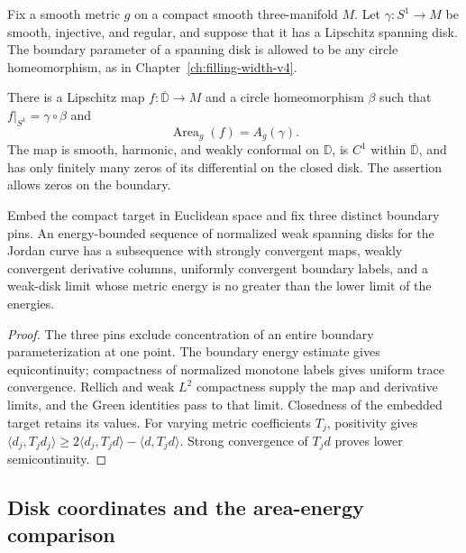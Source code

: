 Fix a smooth metric $g$ on a compact smooth three-manifold $M$.
Let $\gamma:S^1\to M$ be smooth, injective, and regular, and suppose
that it has a Lipschitz spanning disk.  The boundary parameter of a
spanning disk is allowed to be any circle homeomorphism, as in
Chapter~\ref{ch:filling-width-v4}.

\begin{theorem}
\label{thm:annular-plateau}
There is a Lipschitz map $f:\overline{\mathbb D}\to M$ and a circle
homeomorphism $\beta$ such that $f|_{S^1}=\gamma\circ\beta$ and
\[
 \operatorname{Area}_g(f)=A_g(\gamma).
\]
The map is smooth, harmonic, and weakly conformal on $\mathbb D$,
is $C^1$ within $\overline{\mathbb D}$, and has only finitely many
zeros of its differential on the closed disk.  The assertion allows
zeros on the boundary.
\end{theorem}

\begin{lemma}
\label{lem:annular-weak-disks}
Embed the compact target in Euclidean space and fix three distinct
boundary pins. An energy-bounded sequence of normalized weak
spanning disks for the Jordan curve has a subsequence with strongly
convergent maps, weakly convergent derivative columns, uniformly
convergent boundary labels, and a weak-disk limit whose metric
energy is no greater than the lower limit of the energies.
\end{lemma}
\begin{proof}
The three pins exclude concentration of an entire boundary
parameterization at one point. The boundary energy estimate gives
equicontinuity; compactness of normalized monotone labels gives
uniform trace convergence. Rellich and weak $L^2$ compactness
supply the map and derivative limits, and the Green identities
pass to that limit. Closedness of the embedded target retains its
values. For varying metric coefficients $T_j$, positivity gives
$\langle d_j,T_jd_j\rangle\geq
2\langle d_j,T_jd\rangle-\langle d,T_jd\rangle$.
Strong convergence of $T_jd$ proves lower semicontinuity.
\end{proof}

\subsection{Disk coordinates and the area-energy comparison}
\label{sec:annular-disk-beltrami}

